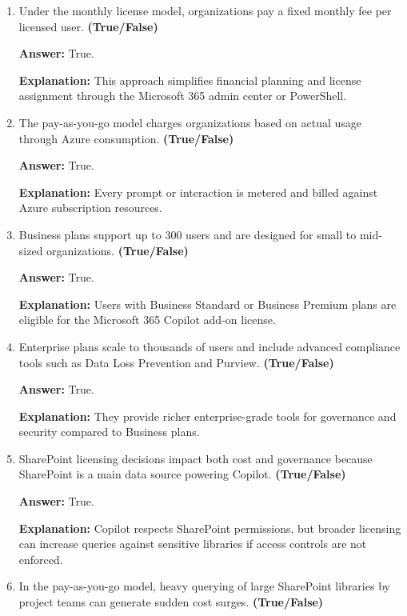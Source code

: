 \documentclass[10pt]{article}
\begin{document}
\begin{enumerate}[leftmargin=*]
\textbf{Answer:} True.

\textbf{Explanation:} The monthly model provides predictable costs, while pay-as-you-go aligns costs with actual usage.

\item Under the monthly license model, organizations pay a fixed monthly fee per licensed user. \textbf{(True/False)}

\textbf{Answer:} True.

\textbf{Explanation:} This approach simplifies financial planning and license assignment through the Microsoft 365 admin center or PowerShell.

\item The pay-as-you-go model charges organizations based on actual usage through Azure consumption. \textbf{(True/False)}

\textbf{Answer:} True.

\textbf{Explanation:} Every prompt or interaction is metered and billed against Azure subscription resources.

\item Business plans support up to 300 users and are designed for small to mid-sized organizations. \textbf{(True/False)}

\textbf{Answer:} True.

\textbf{Explanation:} Users with Business Standard or Business Premium plans are eligible for the Microsoft 365 Copilot add-on license.

\item Enterprise plans scale to thousands of users and include advanced compliance tools such as Data Loss Prevention and Purview. \textbf{(True/False)}

\textbf{Answer:} True.

\textbf{Explanation:} They provide richer enterprise-grade tools for governance and security compared to Business plans.

\item SharePoint licensing decisions impact both cost and governance because SharePoint is a main data source powering Copilot. \textbf{(True/False)}

\textbf{Answer:} True.

\textbf{Explanation:} Copilot respects SharePoint permissions, but broader licensing can increase queries against sensitive libraries if access controls are not enforced.

\item In the pay-as-you-go model, heavy querying of large SharePoint libraries by project teams can generate sudden cost surges. \textbf{(True/False)}


\end{enumerate}
\end{document}
